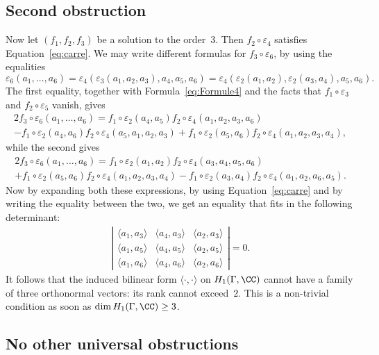\subsection{Second obstruction}

Now let $(f_1,f_2,f_3)$ be a solution to the order~$3$. Then
$f_2\circ\varepsilon_4$ satisfies Equation~\eqref{eq:carre}. We may write
different formulas for $f_3\circ\varepsilon_6$, by using the equalities
\[ \varepsilon_6(a_1,\ldots,a_6)=\varepsilon_4(\varepsilon_3(a_1,a_2,a_3),
a_4,a_5,a_6)=\varepsilon_4(\varepsilon_2(a_1,a_2),\varepsilon_2(a_3,a_4),
a_5,a_6). \]
The first equality, together with Formula~\eqref{eq:Formule4} and the facts
that $f_1\circ\varepsilon_3$ and $f_2\circ\varepsilon_5$ vanish, gives
\begin{multline*}
2f_3\circ\varepsilon_6(a_1,\ldots,a_6)=f_1\circ\varepsilon_2(a_4,a_5)
f_2\circ\varepsilon_4(a_1,a_2,a_3,a_6)\\
-f_1\circ\varepsilon_2(a_4,a_6) f_2\circ\varepsilon_4(a_5,a_1,a_2,a_3)+f_1\circ\varepsilon_2(a_5,a_6)f_2\circ\varepsilon_4(a_1,a_2,a_3,a_4),
\end{multline*}
while the second gives
\begin{multline*}
2f_3\circ\varepsilon_6(a_1,\ldots,a_6)=f_1\circ\varepsilon_2(a_1,a_2)
f_2\circ\varepsilon_4(a_3,a_4,a_5,a_6)\\+f_1\circ\varepsilon_2(a_5,a_6)
f_2\circ\varepsilon_4(a_1,a_2,a_3,a_4)-f_1\circ\varepsilon_2(a_3,a_4)f_2\circ\varepsilon_4(a_1,a_2,a_6,a_5).
\end{multline*}
Now by expanding both these expressions, by using Equation~\eqref{eq:carre}
and by writing the equality between the two, we get an equality that fits
in the following determinant:
\begin{align*}
\left|\begin{array}{ccc}
\langle a_1,a_3\rangle & \langle a_4,a_3\rangle & \langle a_2,a_3\rangle \\
\langle a_1,a_5\rangle & \langle a_4,a_5\rangle & \langle a_2,a_5\rangle \\
\langle a_1,a_6\rangle & \langle a_4,a_6\rangle & \langle a_2,a_6\rangle
\end{array}\right|=0.
\end{align*}
It follows that the induced bilinear form $\langle\cdot,\cdot\rangle$ on
$H_1(\Gamma,\CC)$ cannot have a family of three orthonormal vectors: its
rank cannot exceed~$2$. This is a non-trivial condition as soon as
$\dim H_1(\Gamma,\CC)\geq 3$.

\subsection{No other universal obstructions}

